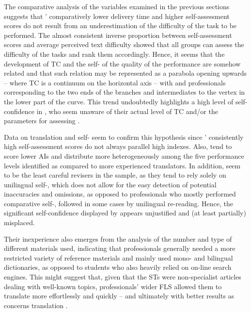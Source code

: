 \documentclass[output=paper]{LSP/langsci}
\begin{document}
The comparative analysis of the variables examined in the previous sections suggests that ' comparatively lower delivery time and higher self-assessment scores do not result from an underestimation of the difficulty of the task to be performed. The almost consistent inverse proportion between self-assessment scores and average perceived text difficulty showed that all groups can assess the difficulty of the tasks and rank them accordingly. Hence, it seems that the development of TC and the self- of the quality of the performance are somehow related and that such relation may be represented as a parabola opening upwards -- where TC is a continuum on the horizontal axis -- with  and professionals corresponding to the two ends of the branches and intermediates to the vertex in the lower part of the curve. This trend undoubtedly highlights a high level of self-confidence in , who seem unaware of their actual level of TC and/or the parameters for assessing .

Data on translation  and self- seem to confirm this hypothesis since ' consistently high self-assessment scores do not always parallel high  indexes. Also,  tend to score lower AIs and distribute more heterogeneously among the five performance levels identified as compared to more experienced translators. In addition,  seem to be the least careful revisers in the sample, as they tend to rely solely on unilingual self-, which does not allow for the easy detection of potential inaccuracies and omissions, as opposed to professionals who mostly performed comparative self-, followed in some cases by unilingual re-reading. Hence, the significant self-confidence displayed by  appears unjustified and (at least partially) misplaced. 

\newpage 
Their inexperience also emerges from the analysis of the number and type of different materials used, indicating that professionals generally needed a more restricted variety of reference materials and mainly used mono- and bilingual dictionaries, as opposed to students who also heavily relied on on-line search engines. This might suggest that, given that the STs were non-specialist articles dealing with well-known topics, professionals' wider FLS \citep[47]{Bell1991} allowed them to translate more effortlessly and quickly -- and ultimately with better results as concerns translation .
\end{document}
